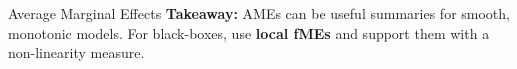 \documentclass[10pt,compress,t,notes=noshow, xcolor=table]{beamer}
\begin{document}
\begin{frame}{Average Marginal Effects}
\vspace{0.2em}
\textbf{Takeaway:} AMEs can be useful summaries for smooth, monotonic models.  
For black-boxes, use \textbf{local fMEs} and support them with a non-linearity measure.

\end{frame}




















\end{document}

